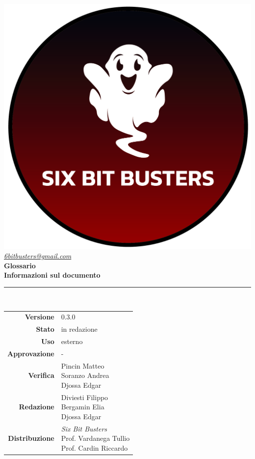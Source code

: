 \thispagestyle{empty}
\renewcommand{\arraystretch}{1.3}


\begin{titlepage}
	\begin{center}
		
	\includegraphics[scale = 0.7]{template/images/logo-circle.png}
	\\[1cm]
	\href{mailto:6bitbusters@gmail.com}		      	
	{\large{\textit{6bitbusters@gmail.com} } }\\[1cm]
	
	\Huge \textbf{Glossario} \\[1cm]

	\large \textbf{Informazioni sul documento} \\
	\rule{0.6\textwidth}{0.4pt}
	\\[0.5cm]
	\begin{tabular}{r|l}
		\textbf{Versione} & 0.3.0\\
		\textbf{Stato} & in redazione\\
		\textbf{Uso} & esterno\\                         
		\textbf{Approvazione} & -\\                      
		\textbf{Verifica} & \parbox[t]{5cm}{Pincin Matteo \\ Soranzo Andrea \\ Djossa Edgar}\\                         
		\textbf{Redazione} & \parbox[t]{5cm}{Diviesti Filippo\\ Bergamin Elia \\ Djossa Edgar}\\
		\textbf{Distribuzione} & \parbox[t]{5cm}{ \textit{Six Bit Busters} \\ Prof. Vardanega Tullio 
	 \\ Prof. Cardin Riccardo}
	\end{tabular}	
	\\[1.2cm]


\end{center}
\end{titlepage}
